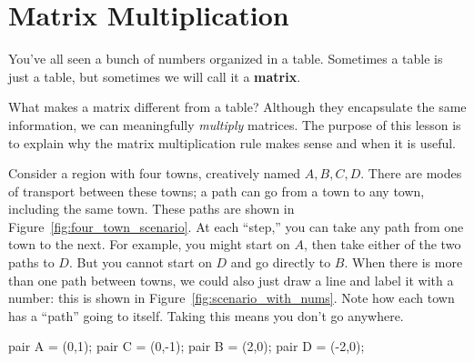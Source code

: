 \documentclass[../gatm.tex]{subfiles}
\begin{document}
\section{Matrix Multiplication}

\newcommand{\indsize}{\scriptsize}
\newcommand{\colind}[2]{\displaystyle\smash{\mathop{#1}^{\raisebox{.5\normalbaselineskip}{$#2$}}}}
\newcommand{\rowind}[1]{\mbox{$#1$}}

You've all seen a bunch of numbers organized in a table. Sometimes a table is just a table, but sometimes we will call it a \textbf{matrix}.

What makes a matrix different from a table? Although they encapsulate the same information, we can meaningfully \textit{multiply} matrices. The purpose of this lesson is to explain why the matrix multiplication rule makes sense and when it is useful.

Consider a region with four towns, creatively named $A,B,C,D$. There are modes of transport between these towns; a path can go from a town to any town, including the same town. These paths are shown in Figure~\ref{fig:four_town_scenario}. At each ``step,'' you can take any path from one town to the next. For example, you might start on $A$, then take either of the two paths to $D$. But you cannot start on $D$ and go directly to $B$. When there is more than one path between towns, we could also just draw a line and label it with a number: this is shown in Figure~\ref{fig:scenario_with_nums}. Note how each town has a ``path'' going to itself. Taking this means you don't go anywhere.

\begin{asydef}
pair A = (0,1);
pair C = (0,-1);
pair B = (2,0);
pair D = (-2,0);
\end{asydef}
\end{document}
